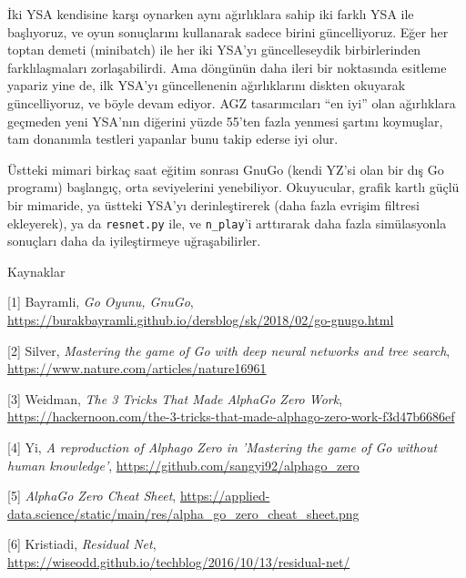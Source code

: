 \documentclass[12pt,fleqn]{article}\usepackage{../../common}
\begin{document}
İki YSA kendisine karşı oynarken aynı ağırlıklara sahip iki farklı YSA ile
başlıyoruz, ve oyun sonuçlarını kullanarak sadece birini
güncelliyoruz. Eğer her toptan demeti (minibatch) ile her iki YSA'yı
güncelleseydik birbirlerinden farklılaşmaları zorlaşabilirdi. Ama döngünün
daha ileri bir noktasında esitleme yapariz yine de, ilk YSA'yı
güncellenenin ağırlıklarını diskten okuyarak güncelliyoruz, ve böyle devam
ediyor. AGZ tasarımcıları ``en iyi'' olan ağırlıklara geçmeden yeni YSA'nın
diğerini yüzde 55'ten fazla yenmesi şartını koymuşlar, tam donanımla
testleri yapanlar bunu takip ederse iyi olur.

Üstteki mimari birkaç saat eğitim sonrası GnuGo (kendi YZ'si olan bir dış
Go programı) başlangıç, orta seviyelerini yenebiliyor. Okuyucular, grafik
kartlı güçlü bir mimaride, ya üstteki YSA'yı derinleştirerek (daha fazla
evrişim filtresi ekleyerek), ya da \verb!resnet.py! ile, ve \verb!n_play!'i
arttırarak daha fazla simülasyonla sonuçları daha da iyileştirmeye
uğraşabilirler.

Kaynaklar

[1] Bayramli, 
    {\em Go Oyunu, GnuGo}, 
    \url{https://burakbayramli.github.io/dersblog/sk/2018/02/go-gnugo.html}

[2] Silver, {\em Mastering the game of Go with deep neural networks and tree search}, \url{https://www.nature.com/articles/nature16961}

[3] Weidman, {\em The 3 Tricks That Made AlphaGo Zero Work}, \url{https://hackernoon.com/the-3-tricks-that-made-alphago-zero-work-f3d47b6686ef}

[4] Yi, {\em A reproduction of Alphago Zero in 'Mastering the game of Go without human knowledge'}, \url{https://github.com/sangyi92/alphago_zero}

[5] {\em AlphaGo Zero Cheat Sheet}, \url{https://applied-data.science/static/main/res/alpha_go_zero_cheat_sheet.png}

[6] Kristiadi, {\em Residual Net}, \url{https://wiseodd.github.io/techblog/2016/10/13/residual-net/}
\end{document}
